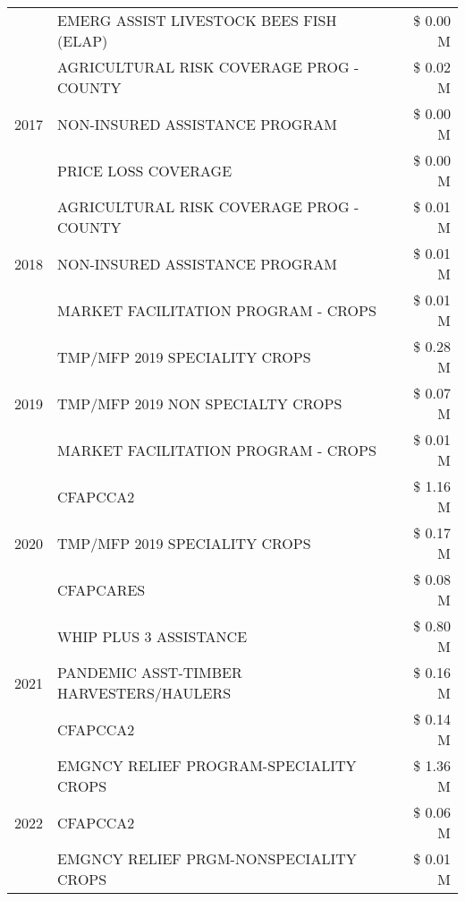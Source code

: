 \begin{tabular}{llr}
 & EMERG ASSIST LIVESTOCK BEES FISH (ELAP) & \$ 0.00 M \\
\cline{1-3}
\multirow[t]{3}{*}{2017} & AGRICULTURAL RISK COVERAGE PROG - COUNTY & \$ 0.02 M \\
 & NON-INSURED ASSISTANCE PROGRAM & \$ 0.00 M \\
 & PRICE LOSS COVERAGE & \$ 0.00 M \\
\cline{1-3}
\multirow[t]{3}{*}{2018} & AGRICULTURAL RISK COVERAGE PROG - COUNTY & \$ 0.01 M \\
 & NON-INSURED ASSISTANCE PROGRAM & \$ 0.01 M \\
 & MARKET FACILITATION PROGRAM - CROPS & \$ 0.01 M \\
\cline{1-3}
\multirow[t]{3}{*}{2019} & TMP/MFP 2019 SPECIALITY CROPS & \$ 0.28 M \\
 & TMP/MFP 2019 NON SPECIALTY CROPS & \$ 0.07 M \\
 & MARKET FACILITATION PROGRAM - CROPS & \$ 0.01 M \\
\cline{1-3}
\multirow[t]{3}{*}{2020} & CFAPCCA2 & \$ 1.16 M \\
 & TMP/MFP 2019 SPECIALITY CROPS & \$ 0.17 M \\
 & CFAPCARES & \$ 0.08 M \\
\cline{1-3}
\multirow[t]{3}{*}{2021} & WHIP PLUS 3 ASSISTANCE & \$ 0.80 M \\
 & PANDEMIC ASST-TIMBER HARVESTERS/HAULERS & \$ 0.16 M \\
 & CFAPCCA2 & \$ 0.14 M \\
\cline{1-3}
\multirow[t]{3}{*}{2022} & EMGNCY RELIEF PROGRAM-SPECIALITY CROPS & \$ 1.36 M \\
 & CFAPCCA2 & \$ 0.06 M \\
 & EMGNCY RELIEF PRGM-NONSPECIALITY CROPS & \$ 0.01 M \\
\cline{1-3}
\bottomrule
\end{tabular}
